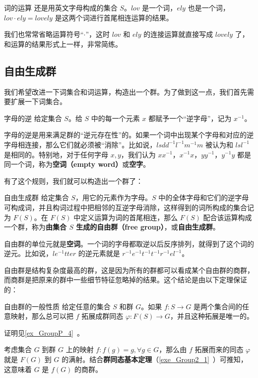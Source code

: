 \begin{example}{词的运算}
还是用英文字母构成的集合 $S$。$lov$ 是一个词，$ely$ 也是一个词，$lov\cdot ely=lovely$ 是这两个词进行首尾相连运算的结果。
\end{example}

我们也常常省略运算符号“$\cdot$”，这时 $lov$ 和 $ely$ 的连接运算就直接写成 $lovely$ 了，和运算的结果形式上一样，非常简练。

\subsection{自由生成群}

我们希望改进一下词集合和词运算，构造出一个群。为了做到这一点，我们首先需要扩展一下词集合。

\begin{definition}{字母的逆}
给定集合 $S$。给 $S$ 中的每一个元素 $x$ 都赋予一个“逆字母”，记为 $x^{-1}$。
\end{definition}

字母的逆是用来满足群的“逆元存在性”的。如果一个词中出现某个字母和对应的逆字母相连接，那么它们就必须被“消除”。比如说，$lsdd^{-1}l^{-1}m^{-1}m$ 被认为和 $lsl^{-1}$ 是相同的。特别地，对于任何字母 $x, y$，我们认为 $xx^{-1}$，$x^{-1}x$，$yy^{-1}$，$y^{-1}y$ 都是同一个词，称为\textbf{空词（empty word）}或\textbf{空字}。

有了这个规则，我们就可以构造出一个群了：

\begin{theorem}{自由生成群}
给定集合 $S$，用它的元素作为字母。$S$ 中的全体字母和它们的逆字母可构成词，并且构词过程中把相邻的互逆字母消除，这样得到的词所构成的集合记为 $F(S)$。在 $F(S)$ 中定义运算为词的首尾相连，那么 $F(S)$ 配合该运算构成一个群，称为\textbf{由集合 $S$ 生成的自由群（free group）}，或\textbf{自由生成群}。
\end{theorem}

自由群的单位元就是\textbf{空词}。一个词的字母都取逆以后反序排列，就得到了这个词的逆元。比如说，$le^{-1}tter$ 的逆元素就是 $r^{-1}e^{-1}t^{-1}t^{-1}r^{-1}el^{-1}$。

自由群是结构复杂度最高的群，这是因为所有的群都可以看成某个自由群的商群，而商群是把原来的群中一些细节特征忽略掉的结果。这个结论是由以下定理保证的：

\begin{theorem}{自由群的一般性质}\label{the_FreGrp_1}
给定任意的集合 $S$ 和群 $G$。如果 $f:S\rightarrow G$ 是两个集合间的任意映射，那么总可以把 $f$ 拓展成群同态 $\varphi:F(S)\rightarrow G$，并且这种拓展是唯一的。
\end{theorem}

证明见\autoref{ex_GroupP_4}~。

考虑集合 $G$ 到群 $G$ 上的映射 $f:f(g)=g, \forall g\in G$，那么由 $f$ 拓展而来的同态 $\varphi$ 就是 $F(G)$ 到 $G$ 的满射。结合\textbf{群同态基本定理}（\autoref{exe_Group2_1}~）可推知，这意味着 $G$ 是 $f(G)$ 的商群。

